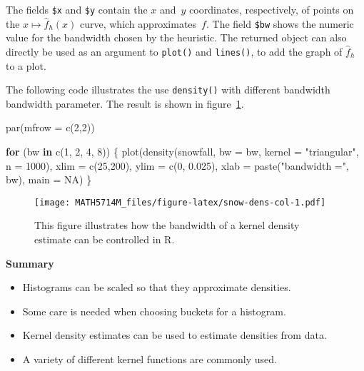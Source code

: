 \documentclass[
  a4paper,
]{article}
\newenvironment{Shaded}{\begin{snugshade}}{\end{snugshade}}
\newcommand{\AttributeTok}[1]{\textcolor[rgb]{0.77,0.63,0.00}{#1}}
\newcommand{\ConstantTok}[1]{\textcolor[rgb]{0.00,0.00,0.00}{#1}}
\newcommand{\ControlFlowTok}[1]{\textcolor[rgb]{0.13,0.29,0.53}{\textbf{#1}}}
\newcommand{\DecValTok}[1]{\textcolor[rgb]{0.00,0.00,0.81}{#1}}
\newcommand{\FloatTok}[1]{\textcolor[rgb]{0.00,0.00,0.81}{#1}}
\newcommand{\FunctionTok}[1]{\textcolor[rgb]{0.00,0.00,0.00}{#1}}
\newcommand{\NormalTok}[1]{#1}
\newcommand{\StringTok}[1]{\textcolor[rgb]{0.31,0.60,0.02}{#1}}
\providecommand{\tightlist}{%
  \setlength{\itemsep}{0pt}\setlength{\parskip}{0pt}}
\theoremstyle{definition}
\theoremstyle{definition}
\theoremstyle{definition}
\theoremstyle{definition}
\theoremstyle{remark}
\begin{document}
The fields \texttt{\$x} and \texttt{\$y} contain the \(x\) and~\(y\) coordinates, respectively,
of points on the \(x \mapsto \hat f_h(x)\) curve, which approximates~\(f\).
The field \texttt{\$bw} shows the numeric value for the bandwidth chosen by
the heuristic. The returned object can also directly be used
as an argument to \texttt{plot()} and \texttt{lines()}, to add the graph of \(\hat f_h\)
to a plot.

The following code illustrates the use \texttt{density()} with different bandwidth
bandwidth parameter. The result is shown in figure~\ref{fig:snow-dens-col}.



\begin{Shaded}
\begin{Highlighting}[]
\FunctionTok{par}\NormalTok{(}\AttributeTok{mfrow =} \FunctionTok{c}\NormalTok{(}\DecValTok{2}\NormalTok{,}\DecValTok{2}\NormalTok{))}

\ControlFlowTok{for}\NormalTok{ (bw }\ControlFlowTok{in} \FunctionTok{c}\NormalTok{(}\DecValTok{1}\NormalTok{, }\DecValTok{2}\NormalTok{, }\DecValTok{4}\NormalTok{, }\DecValTok{8}\NormalTok{)) \{}
  \FunctionTok{plot}\NormalTok{(}\FunctionTok{density}\NormalTok{(snowfall, }\AttributeTok{bw =}\NormalTok{ bw, }\AttributeTok{kernel =} \StringTok{"triangular"}\NormalTok{, }\AttributeTok{n =} \DecValTok{1000}\NormalTok{),}
    \AttributeTok{xlim =} \FunctionTok{c}\NormalTok{(}\DecValTok{25}\NormalTok{,}\DecValTok{200}\NormalTok{),}
    \AttributeTok{ylim =} \FunctionTok{c}\NormalTok{(}\DecValTok{0}\NormalTok{, }\FloatTok{0.025}\NormalTok{),}
    \AttributeTok{xlab =} \FunctionTok{paste}\NormalTok{(}\StringTok{"bandwidth ="}\NormalTok{, bw),}
    \AttributeTok{main =} \ConstantTok{NA}\NormalTok{)}
\NormalTok{\}}
\end{Highlighting}
\end{Shaded}

\begin{figure}
\centering
\texttt{[image: MATH5714M\_files/figure-latex/snow-dens-col-1.pdf]}
\caption{\label{fig:snow-dens-col}This figure illustrates how the bandwidth of a kernel density estimate can be controlled in R.}
\end{figure}

\textbf{Summary}

\begin{itemize}
\tightlist
\item
  Histograms can be scaled so that they approximate densities.
\item
  Some care is needed when choosing buckets for a histogram.
\item
  Kernel density estimates can be used to estimate densities from data.
\item
  A variety of different kernel functions are commonly used.
\end{itemize}
\end{document}
